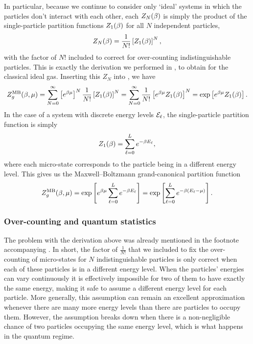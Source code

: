 In particular, because we continue to consider only `ideal' systems in which the particles don't interact with each other, each $Z_N(\beta)$ is simply the product of the single-particle partition functions $Z_1(\beta)$ for all $N$ independent particles,
\begin{equation*}
  Z_N(\beta) = \frac{1}{N!} \left[Z_1(\beta)\right]^N,
\end{equation*}
with the factor of $N!$ included to correct for over-counting indistinguishable particles.
This is exactly the derivation we performed in , to obtain  for the classical ideal gas.
Inserting this $Z_N$ into , we have
\begin{equation*}
  Z_g^{\text{MB}}(\beta, \mu) = \sum_{N = 0}^{\infty} \left[e^{\beta\mu}\right]^N \frac{1}{N!} \left[Z_1(\beta)\right]^N = \sum_{N = 0}^{\infty} \frac{1}{N!} \left[e^{\beta\mu} Z_1(\beta)\right]^N = \exp\left[e^{\beta\mu} Z_1(\beta)\right].
\end{equation*}
In the case of a system with discrete energy levels $\mathcal E_{\ell}$, the single-particle partition function is simply
\begin{equation*}
  Z_1(\beta) = \sum_{\ell = 0}^L e^{-\beta E_{\ell}},
\end{equation*}
where each micro-state corresponds to the particle being in a different energy level.
This gives us the Maxwell--Boltzmann grand-canonical partition function
\begin{equation}
  \label{eq:partfunc_MB_nonfactor}
  Z_g^{\text{MB}}(\beta, \mu) = \exp\left[e^{\beta\mu} \sum_{\ell = 0}^L e^{-\beta E_{\ell}} \right] = \exp\left[\sum_{\ell = 0}^L e^{-\beta\left(E_{\ell} - \mu\right)}\right].
\end{equation}



\subsubsection{Over-counting and quantum statistics}
The problem with the derivation above was already mentioned in the footnote accompanying .
In short, the factor of $\frac{1}{N!}$ that we included to fix the over-counting of micro-states for $N$ indistinguishable particles is only correct when each of these particles is in a different energy level.
When the particles' energies can vary continuously it is effectively impossible for two of them to have exactly the same energy, making it safe to assume a different energy level for each particle.
More generally, this assumption can remain an excellent approximation whenever there are many more energy levels than there are particles to occupy them.
However, the assumption breaks down when there is a non-negligible chance of two particles occupying the same energy level, which is what happens in the quantum regime.

